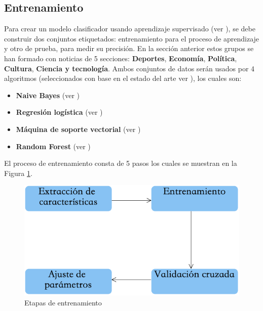 


\subsection{Entrenamiento}

Para crear un modelo clasificador usando aprendizaje supervisado (ver ), se debe construir dos conjuntos etiquetados: entrenamiento para el proceso de aprendizaje y otro de prueba, para medir su precisión. En la sección anterior estos grupos se han formado con noticias de 5 secciones: \textbf{Deportes}, \textbf{Economía}, \textbf{Política}, \textbf{Cultura}, \textbf{Ciencia y tecnología}. Ambos conjuntos de datos serán usados por 4 algoritmos (seleccionados con base en el estado del arte ver ), los cuales son:

\begin{itemize}
	\item \textbf{Naive Bayes} (ver )
	\item \textbf{Regresión logística} (ver )
	\item \textbf{Máquina de soporte vectorial} (ver )
	\item \textbf{Random Forest} (ver )
\end{itemize}

El proceso de entrenamiento consta de 5 pasos los cuales se muestran en la Figura \ref{fig:cp5:entrenamiento}.

\begin{figure}[h]
\centering
\includegraphics[scale=.55]{imagenes/capitulo5/Entrenamiento/Entrenamiento.png}
\caption{Etapas de entrenamiento}
\label{fig:cp5:entrenamiento}
\end{figure}

